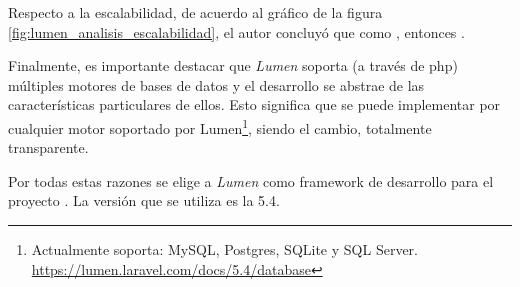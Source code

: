 
Respecto a la escalabilidad, de acuerdo al gráfico de la figura \ref{fig:lumen_analisis_escalabilidad}, el autor concluyó que como , entonces  \cite{biler2015performance}.


Finalmente, es importante destacar que \textit{Lumen} soporta (a través de \gls{php}) múltiples motores de bases de datos y el desarrollo se abstrae de las características particulares de ellos. Esto significa que se puede implementar por cualquier motor soportado por Lumen\footnote{Actualmente soporta: MySQL, Postgres, SQLite y SQL Server. \url{https://lumen.laravel.com/docs/5.4/database}}, siendo el cambio, totalmente transparente.

Por todas estas razones se elige a \textit{Lumen} como \gls{framework} de desarrollo para el proyecto \nombreApp. La versión que se utiliza es la 5.4.


